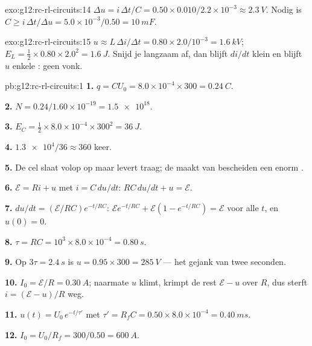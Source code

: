 \begin{solution}{exo:g12:rc-rl-circuits:14}
$\Delta u = i\,\Delta t/C = 0.50 \times 0.010/2.2\times10^{-3} \approx
\qty{2.3}{V}$. Nodig is $C \geq i\,\Delta t/\Delta u =
5.0\times10^{-3}/0.50 = \qty{10}{mF}$.
\end{solution}

\begin{solution}{exo:g12:rc-rl-circuits:15}
$u \approx L\,\Delta i/\Delta t = 0.80 \times 2.0/10^{-3} = \qty{1.6}{kV}$;
$E_L = \tfrac12 \times 0.80 \times 2.0^2 = \qty{1.6}{J}$. Snijd je langzaam
af, dan blijft $di/dt$ klein en blijft $u$ enkele : geen vonk.
\end{solution}

\begin{solution}{pb:g12:rc-rl-circuits:1}
\textbf{1.} $q = CU_0 = 8.0\times10^{-4} \times 300 = \qty{0.24}{C}$.

\textbf{2.} $N = 0.24/1.60\times10^{-19} = \num{1.5e18}$.

\textbf{3.} $E_C = \tfrac12 \times 8.0\times10^{-4} \times 300^2 =
\qty{36}{J}$.

\textbf{4.} $\num{1.3e4}/36 \approx 360$ keer.

\textbf{5.} De cel slaat volop op maar levert traag; de  maakt van
bescheiden  een enorm \emph{}.

\textbf{6.} $\mathcal{E} = Ri + u$ met $i = C\,du/dt$:
$RC\,du/dt + u = \mathcal{E}$.

\textbf{7.} $du/dt = (\mathcal{E}/RC)e^{-t/RC}$:
$\mathcal{E}e^{-t/RC} + \mathcal{E}(1 - e^{-t/RC}) = \mathcal{E}$ voor alle
$t$, en $u(0) = 0$.

\textbf{8.} $\tau = RC = 10^3 \times 8.0\times10^{-4} = \qty{0.80}{s}$.

\textbf{9.} Op $3\tau = \qty{2.4}{s}$ is $u = 0.95 \times 300 = \qty{285}{V}$
--- het gejank van twee seconden.

\textbf{10.} $I_0 = \mathcal{E}/R = \qty{0.30}{A}$; naarmate $u$ klimt, krimpt
de rest $\mathcal{E} - u$ over $R$, dus sterft $i = (\mathcal{E}-u)/R$ weg.

\textbf{11.} $u(t) = U_0\,e^{-t/\tau'}$ met $\tau' = R_f C =
0.50 \times 8.0\times10^{-4} = \qty{0.40}{ms}$.

\textbf{12.} $I_0 = U_0/R_f = 300/0.50 = \qty{600}{A}$.


\end{solution}

